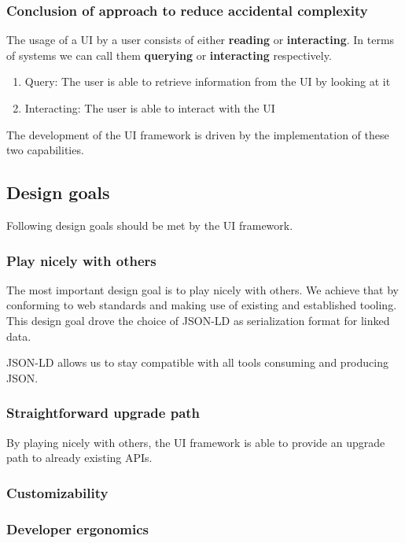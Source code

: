 \subsubsection{Conclusion of approach to reduce accidental complexity}

The usage of a UI by a user consists of either \textbf{reading} or \textbf{interacting}. In terms of systems we can call them \textbf{querying} or \textbf{interacting} respectively.
\begin{enumerate}
  \item Query: The user is able to retrieve information from the UI by looking at it
  \item Interacting: The user is able to interact with the UI
\end{enumerate}

The development of the UI framework is driven by the implementation of these two capabilities.

\subsection{Design goals}
Following design goals should be met by the UI framework.

\subsubsection{Play nicely with others}\label{usecases}
The most important design goal is to play nicely with others. We achieve that by conforming to web standards and making use of existing and established tooling. This design goal drove the choice of JSON-LD as serialization format for linked data.

JSON-LD allows us to stay compatible with all tools consuming and producing JSON.

\subsubsection{Straightforward upgrade path}\label{usecases}
By playing nicely with others, the UI framework is able to provide an upgrade path to already existing APIs.

\subsubsection{Customizability}\label{usecases}

\subsubsection{Developer ergonomics}\label{usecases}

